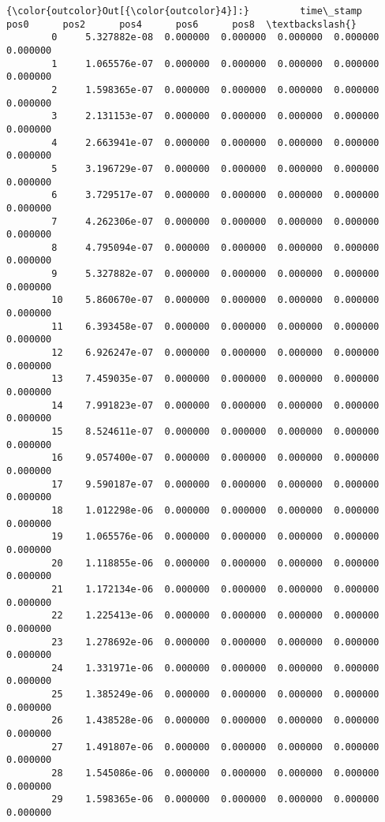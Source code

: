 \documentclass[11pt]{article}
\begin{document}
\begin{Verbatim}[commandchars=\\\{\}]
{\color{outcolor}Out[{\color{outcolor}4}]:}         time\_stamp      pos0      pos2      pos4      pos6      pos8  \textbackslash{}
        0     5.327882e-08  0.000000  0.000000  0.000000  0.000000  0.000000   
        1     1.065576e-07  0.000000  0.000000  0.000000  0.000000  0.000000   
        2     1.598365e-07  0.000000  0.000000  0.000000  0.000000  0.000000   
        3     2.131153e-07  0.000000  0.000000  0.000000  0.000000  0.000000   
        4     2.663941e-07  0.000000  0.000000  0.000000  0.000000  0.000000   
        5     3.196729e-07  0.000000  0.000000  0.000000  0.000000  0.000000   
        6     3.729517e-07  0.000000  0.000000  0.000000  0.000000  0.000000   
        7     4.262306e-07  0.000000  0.000000  0.000000  0.000000  0.000000   
        8     4.795094e-07  0.000000  0.000000  0.000000  0.000000  0.000000   
        9     5.327882e-07  0.000000  0.000000  0.000000  0.000000  0.000000   
        10    5.860670e-07  0.000000  0.000000  0.000000  0.000000  0.000000   
        11    6.393458e-07  0.000000  0.000000  0.000000  0.000000  0.000000   
        12    6.926247e-07  0.000000  0.000000  0.000000  0.000000  0.000000   
        13    7.459035e-07  0.000000  0.000000  0.000000  0.000000  0.000000   
        14    7.991823e-07  0.000000  0.000000  0.000000  0.000000  0.000000   
        15    8.524611e-07  0.000000  0.000000  0.000000  0.000000  0.000000   
        16    9.057400e-07  0.000000  0.000000  0.000000  0.000000  0.000000   
        17    9.590187e-07  0.000000  0.000000  0.000000  0.000000  0.000000   
        18    1.012298e-06  0.000000  0.000000  0.000000  0.000000  0.000000   
        19    1.065576e-06  0.000000  0.000000  0.000000  0.000000  0.000000   
        20    1.118855e-06  0.000000  0.000000  0.000000  0.000000  0.000000   
        21    1.172134e-06  0.000000  0.000000  0.000000  0.000000  0.000000   
        22    1.225413e-06  0.000000  0.000000  0.000000  0.000000  0.000000   
        23    1.278692e-06  0.000000  0.000000  0.000000  0.000000  0.000000   
        24    1.331971e-06  0.000000  0.000000  0.000000  0.000000  0.000000   
        25    1.385249e-06  0.000000  0.000000  0.000000  0.000000  0.000000   
        26    1.438528e-06  0.000000  0.000000  0.000000  0.000000  0.000000   
        27    1.491807e-06  0.000000  0.000000  0.000000  0.000000  0.000000   
        28    1.545086e-06  0.000000  0.000000  0.000000  0.000000  0.000000   
        29    1.598365e-06  0.000000  0.000000  0.000000  0.000000  0.000000   

\end{Verbatim}
\end{document}

